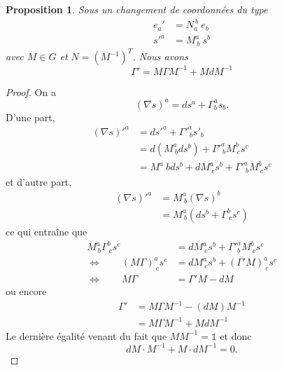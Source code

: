 \documentclass[a4paper,11pt]{report}
\theoremstyle{definition}
\theoremstyle{plain}
\newtheorem{prop}[thm]{Proposition}
\theoremstyle{definition}
\theoremstyle{remark}
\begin{document}
            \begin{prop}
                Sous un changement de coordonnées du type
                \begin{align}
                    e_a' &= N_a^{~b}~e_b \\
                    s'^a &= M^a_{~b} ~s^b
                \end{align}
                 avec $M\in G$ et $N = (M^{-1})^T$. Nous avons
                 \begin{equation}
                     \Gamma' = M\Gamma M^{-1} + MdM^{-1}
                 \end{equation}
            \end{prop}
        
            \begin{proof}
                On a 
                \begin{equation}
                    (\nabla s)^a = ds^a + \Gamma^a_b s_b.
                \end{equation}
                D'une part, 
                \begin{align}
                    (\nabla s)'^a &= ds'^a +  \Gamma'^a_{~b} s'_b \\
                    &= d(M^a_{~b} ds^b) + \Gamma'^a_{~b} M^b_{~c}s^c \\
                    &= M^a{~b}ds^b + dM^a_{~c}s^b + \Gamma'^a_{~b} M^b_{~c}s^c
                \end{align}
                et d'autre part,
                \begin{align}
                    (\nabla s)'^a &= M^a_{~b}(\nabla s)^b \\
                    &=  M^a_{~b}\left( ds^b+\Gamma^b_{~c}s^c \right)
                \end{align}
                ce qui entraîne que
                \begin{align}
                     M^a_{~b}\Gamma^b_{~c}s^c &=  dM^a_{~c}s^b + \Gamma'^a_b M^b_{~c}s^c\\
                     \Leftrightarrow \qquad (M\Gamma)^a_{~c}s^c &= dM^a_{~c}s^b + (\Gamma'M)^a_{~c}s^c\\ 
                     \Leftrightarrow \qquad M\Gamma &= \Gamma'M - dM
                \end{align}
                ou encore
                \begin{align}
                    \Gamma' &= M\Gamma M^{-1}-(dM)M^{-1}\\
                    &= M\Gamma M^{-1} + MdM^{-1}
                \end{align}
                Le dernière égalité venant du fait que $MM^{-1} = \mathbb{1}$ et donc 
                \begin{equation}
                    dM\cdot M^{-1} + M\cdot dM^{-1} = 0.
                \end{equation}
            \end{proof}
        
\end{document}
